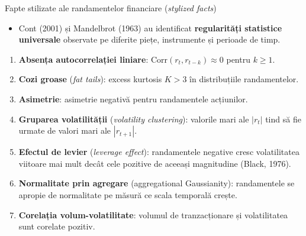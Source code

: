 \documentclass[9pt, aspectratio=169, t]{beamer}
\theoremstyle{definition}
\newcommand{\Corr}{\text{Corr}}
\begin{document}
\begin{frame}{Fapte stilizate ale randamentelor financiare (\textit{stylized facts})}
\begin{itemize}
    \item Cont (2001) și Mandelbrot (1963) au identificat \textbf{regularități statistice universale} observate pe diferite piețe, instrumente și perioade de timp.
\end{itemize}
\vspace{0.15cm}
\begin{enumerate}
    \item \textbf{Absența autocorrelației liniare}: $\Corr(r_t, r_{t-k}) \approx 0$ pentru $k \geq 1$.
    \item \textbf{Cozi groase} (\textit{fat tails}): excess kurtosis $K > 3$ în distribuțiile randamentelor.
    \item \textbf{Asimetrie}: asimetrie negativă pentru randamentele acțiunilor.
    \item \textbf{Gruparea volatilității} (\textit{volatility clustering}): valorile mari ale $|r_t|$ tind să fie urmate de valori mari ale $|r_{t+1}|$.
    \item \textbf{Efectul de levier} (\textit{leverage effect}): randamentele negative cresc volatilitatea viitoare mai mult decât cele pozitive de aceeași magnitudine (Black, 1976).
    \item \textbf{Normalitate prin agregare} (aggregational Gaussianity): randamentele se apropie de normalitate pe măsură ce scala temporală crește.
    \item \textbf{Corelația volum-volatilitate}: volumul de tranzacționare și volatilitatea sunt corelate pozitiv.
\end{enumerate}
\end{frame}
\end{document}
